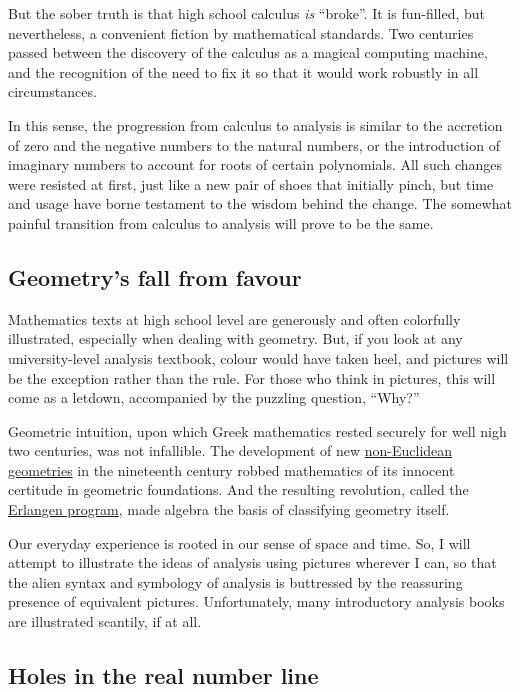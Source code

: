 \documentclass[
  a4paper,
]{article}
\begin{document}
But the sober truth is that high school calculus \emph{is} ``broke''. It
is fun-filled, but nevertheless, a convenient fiction by mathematical
standards. Two centuries passed between the discovery of the calculus as
a magical computing machine, and the recognition of the need to fix it
so that it would work robustly in all circumstances.

In this sense, the progression from calculus to analysis is similar to
the accretion of zero and the negative numbers to the natural numbers,
or the introduction of imaginary numbers to account for roots of certain
polynomials. All such changes were resisted at first, just like a new
pair of shoes that initially pinch, but time and usage have borne
testament to the wisdom behind the change. The somewhat painful
transition from calculus to analysis will prove to be the same.

\subsection{Geometry's fall from
favour}\label{geometrys-fall-from-favour}

Mathematics texts at high school level are generously and often
colorfully illustrated, especially when dealing with geometry. But, if
you look at any university-level analysis textbook, colour would have
taken heel, and pictures will be the exception rather than the rule. For
those who think in pictures, this will come as a letdown, accompanied by
the puzzling question, ``Why?''

Geometric intuition, upon which Greek mathematics rested securely for
well nigh two centuries, was not infallible. The development of new
\href{https://en.wikipedia.org/wiki/Non-Euclidean_geometry}{non-Euclidean
geometries} in the nineteenth century robbed mathematics of its innocent
certitude in geometric foundations. And the resulting revolution, called
the \href{https://en.wikipedia.org/wiki/Erlangen_program}{Erlangen
program}, made algebra the basis of classifying geometry itself.

Our everyday experience is rooted in our sense of space and time. So, I
will attempt to illustrate the ideas of analysis using pictures wherever
I can, so that the alien syntax and symbology of analysis is buttressed
by the reassuring presence of equivalent pictures. Unfortunately, many
introductory analysis books are illustrated scantily, if at all.

\subsection{Holes in the real number
line}\label{holes-in-the-real-number-line}
\end{document}
